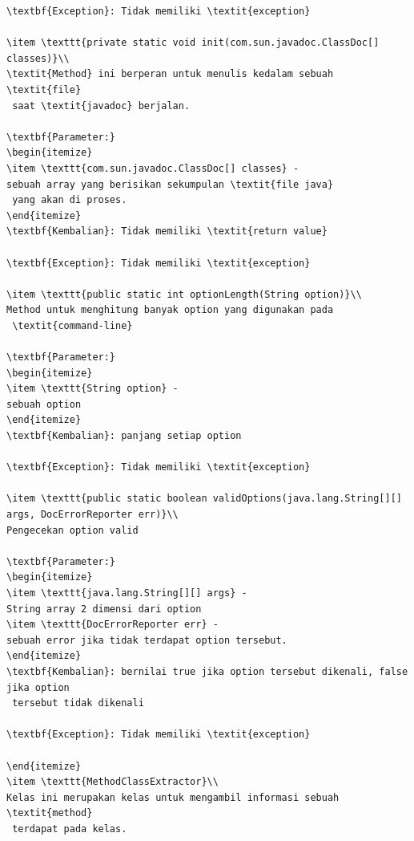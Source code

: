 \documentclass[a4paper,twoside]{article}
\begin{document}
\begin{enumerate}
\begin{lstlisting}[caption=Hasil Implementasi]
\textbf{Exception}: Tidak memiliki \textit{exception}

\item \texttt{private static void init(com.sun.javadoc.ClassDoc[] classes)}\\ 
\textit{Method} ini berperan untuk menulis kedalam sebuah \textit{file}
 saat \textit{javadoc} berjalan.

\textbf{Parameter:}
\begin{itemize}
\item \texttt{com.sun.javadoc.ClassDoc[] classes} - 
sebuah array yang berisikan sekumpulan \textit{file java}
 yang akan di proses.
\end{itemize}
\textbf{Kembalian}: Tidak memiliki \textit{return value}

\textbf{Exception}: Tidak memiliki \textit{exception}

\item \texttt{public static int optionLength(String option)}\\ 
Method untuk menghitung banyak option yang digunakan pada
 \textit{command-line}

\textbf{Parameter:}
\begin{itemize}
\item \texttt{String option} - 
sebuah option
\end{itemize}
\textbf{Kembalian}: panjang setiap option

\textbf{Exception}: Tidak memiliki \textit{exception}

\item \texttt{public static boolean validOptions(java.lang.String[][] args, DocErrorReporter err)}\\ 
Pengecekan option valid

\textbf{Parameter:}
\begin{itemize}
\item \texttt{java.lang.String[][] args} - 
String array 2 dimensi dari option
\item \texttt{DocErrorReporter err} - 
sebuah error jika tidak terdapat option tersebut.
\end{itemize}
\textbf{Kembalian}: bernilai true jika option tersebut dikenali, false jika option
 tersebut tidak dikenali

\textbf{Exception}: Tidak memiliki \textit{exception}

\end{itemize}
\item \texttt{MethodClassExtractor}\\ 
Kelas ini merupakan kelas untuk mengambil informasi sebuah \textit{method}
 terdapat pada kelas.


\end{lstlisting}
\end{enumerate}
\end{document}
